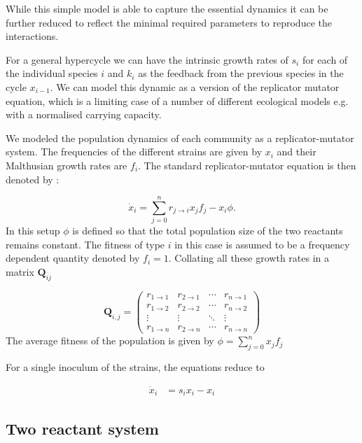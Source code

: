While this simple model is able to capture the essential dynamics it can be further reduced to reflect the minimal required parameters to reproduce the interactions.

For a general hypercycle we can have the intrinsic growth rates of $s_i$ for each of the individual species $i$ and $k_i$ as the feedback from the previous species in the cycle $x_{i-1}$.
We can model this dynamic as a version of the replicator mutator equation, which is a limiting case of a number of different ecological models e.g. with a normalised carrying capacity.

We modeled the population dynamics of each community as a replicator-mutator system.
The frequencies of the different strains are given by $x_i$ and their Malthusian growth rates are $f_i$.
The standard replicator-mutator equation is then denoted by \citep{nowak:TREE:1992,nowak:book:2006}:

\begin{equation}
	\dot{x}_i = \sum_{j=0}^{n} r_{j \rightarrow i} x_j f_j - x_i \phi.
\end{equation}
In this setup $\phi$ is defined so that the total population size of the two reactants remains constant.
The fitness of type $i$ in this case is assumed to be a frequency dependent quantity denoted by $f_i = 1$. Collating all these growth rates in a matrix $\mathbf{Q}_{ij}$

\begin{equation}
	\mathbf{Q}_{i,j} =
 \begin{pmatrix}
  r_{1 \rightarrow 1} & r_{2 \rightarrow 1} & \cdots & r_{n \rightarrow 1} \\
  r_{1 \rightarrow 2} & r_{2 \rightarrow 2} & \cdots & r_{n \rightarrow 2} \\
  \vdots  & \vdots  & \ddots & \vdots  \\
  r_{1 \rightarrow n} & r_{2 \rightarrow n} & \cdots & r_{n \rightarrow n} 
 \end{pmatrix}
\end{equation}
The average fitness of the population is given by $\phi = \sum_{j=0}^{n} x_j f_j$

For a single inoculum of the strains, the equations reduce to

\begin{align}
	\dot{x}_i &=  s_i x_i - x_i
\end{align}

\subsection{Two reactant system}


